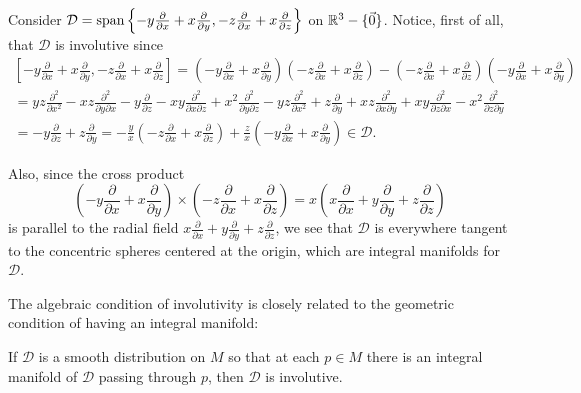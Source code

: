\begin{example}
	Consider $\mathcal{D} = \operatorname{span} \left\{ -y \frac{\partial}{\partial x} + x \frac{\partial}{\partial y}, -z \frac{\partial}{\partial x} + x \frac{\partial}{\partial z}\right\}$ on $\mathbb{R}^3 - \{\vec{0}\}$. Notice, first of all, that $\mathcal{D}$ is involutive since
	\begin{multline*}
		\left[ -y \frac{\partial}{\partial x} + x \frac{\partial}{\partial y}, -z \frac{\partial}{\partial x} + x \frac{\partial}{\partial z}\right] = \left( -y \frac{\partial}{\partial x} + x \frac{\partial}{\partial y}\right) \left( -z \frac{\partial}{\partial x} + x \frac{\partial}{\partial z}\right) - \left( -z \frac{\partial}{\partial x} + x \frac{\partial}{\partial z}\right)\left( -y \frac{\partial}{\partial x} + x \frac{\partial}{\partial y}\right)  \\
		= yz \frac{\partial^2}{\partial x^2} -xz \frac{\partial^2}{\partial y \partial x} -y \frac{\partial}{\partial z} - xy \frac{\partial^2}{\partial x \partial z} + x^2 \frac{\partial^2}{\partial y \partial z} -yz \frac{\partial^2}{\partial x^2} +z \frac{\partial}{\partial y} + xz \frac{\partial^2}{\partial x \partial y} + xy \frac{\partial^2}{\partial z \partial x} -x^2 \frac{\partial^2}{\partial z \partial y} \\
		= -y\frac{\partial }{\partial z} + z \frac{\partial }{\partial y} = - \frac{y}{x} \left(-z \frac{\partial}{\partial x} + x \frac{\partial }{\partial z } \right) + \frac{z}{x} \left( - y \frac{\partial }{\partial x} + x \frac{\partial }{\partial y}\right)  \in \mathcal{D}.
	\end{multline*}
	
	Also, since the cross product
	\[
		\left( -y \frac{\partial}{\partial x} + x \frac{\partial}{\partial y}\right) \times \left( -z \frac{\partial}{\partial x} + x \frac{\partial}{\partial z}\right) = x\left( x \frac{\partial}{\partial x} + y \frac{\partial}{\partial y} +z \frac{\partial}{\partial z} \right)
	\]
	is parallel to the radial field $x \frac{\partial}{\partial x} + y \frac{\partial}{\partial y} +z \frac{\partial}{\partial z}$, we see that $\mathcal{D}$ is everywhere tangent to the concentric spheres centered at the origin, which are integral manifolds for $\mathcal{D}$.
\end{example}

The algebraic condition of involutivity is closely related to the geometric condition of having an integral manifold:

\begin{proposition}\label{prop:integra implies involutive}
	If $\mathcal{D}$ is a smooth distribution on $M$ so that at each $p \in M$ there is an integral manifold of $\mathcal{D}$ passing through $p$, then $\mathcal{D}$ is involutive.
\end{proposition}


